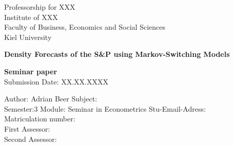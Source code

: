 \documentclass[11pt,a4paper]{article}
\begin{document}
\pagestyle{empty}
	
\begin{titlepage}				
	\begin{center}
Professorship for XXX\\
Institute of XXX\\
Faculty of Business, Economics and Social Sciences\\
Kiel University \\
		\vspace{5cm}
		
		\LARGE{ \bf{Density Forecasts of the S\&P using Markov-Switching Models}}
		\vspace{2cm}
		
		\large{\bf{Seminar paper}}\\
		Submission Date: XX.XX.XXXX
		\vspace{1.5cm}

\begin{flushleft}
\vfill
	Author: Adrian Beer
	Subject:\\
	Semester:3
	Module: Seminar in Econometrics
	Stu-Email-Adress:\\
	Matriculation number:\\
	\vspace{1cm}
	First Assessor:\\
	Second Assessor:
\end{flushleft}	
		
				
	\end{center}

\end{titlepage}




\newpage
	\tableofcontents
	\newpage


\pagestyle{fancy}					
\fancyhf{}								
\fancyhead[R]{}							 
\renewcommand{\headrulewidth}{0pt}	 
\fancyfoot[R]{\thepage}				 
\renewcommand{\footrulewidth}{0pt}	 
\setcounter{page}{1}



\listoffigures


\newpage
\listoftables
\newpage
\end{document}
